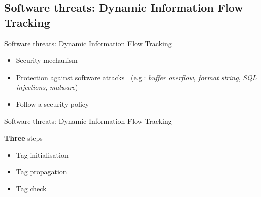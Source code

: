 \subsection{Software threats: Dynamic Information Flow Tracking}
\begin{frame}{Software threats: Dynamic Information Flow Tracking}
        \begin{block}{}
            \begin{itemize}
                [square]
                \justifying
                \item Security mechanism
                \item Protection against software attacks~\cite{HAK-21-acmcsur} (e.g.: \textit{buffer overflow}, \textit{format string}, \textit{SQL injections}, \textit{malware})
                \item Follow a security policy
            \end{itemize}
        \end{block}
\end{frame}

\begin{frame}{Software threats: Dynamic Information Flow Tracking}
    \begin{minipage}[c]{0.35\linewidth}
        \begingroup
        \begin{block}{\textbf{Three} steps}
            \begin{itemize}
                \item<1-> Tag initialisation
                \item<2-> Tag propagation
                \item<3-> Tag check
            \end{itemize}
        \end{block}
        \endgroup
    \end{minipage}\hfill%
    \begin{minipage}[c]{0.6\linewidth}
        \begin{figure}
            \centering
            \label{fig:schemaDIFT}
        \end{figure}
    \end{minipage}
\end{frame}

